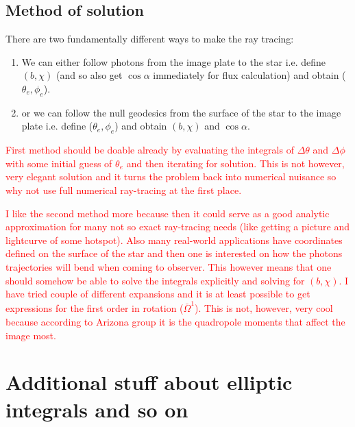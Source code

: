 \documentclass[iop, usenatbib]{emulateapj}
\newcommand{\red}[1]{\textcolor{red}{#1}}
\newcommand{\Ob}{\ensuremath{\bar{\Omega}}}
\begin{document}


\clearpage
\appendix

\subsection{Method of solution}
There are two fundamentally different ways to make the ray tracing:
\begin{enumerate}
\item We can either follow photons from the image plate to the star i.e. define $(b,\chi)$ (and so also get $\cos\alpha$ immediately for flux calculation) and obtain ($\theta_e,\phi_e$).
\item or we can follow the null geodesics from the surface of the star to the image plate i.e. define ($\theta_e,\phi_e$) and obtain $(b, \chi)$ and $\cos\alpha$.
\end{enumerate}

\red{
First method should be doable already by evaluating the integrals of $\Delta\theta$ and $\Delta\phi$ with some initial guess of $\theta_e$ and then iterating for solution.
This is not however, very elegant solution and it turns the problem back into numerical nuisance so why not use full numerical ray-tracing at the first place.
}

\red{
I like the second method more because then it could serve as a good analytic approximation for many not so exact ray-tracing needs (like getting a picture and lightcurve of some hotspot).
Also many real-world applications have coordinates defined on the surface of the star and then one is interested on how the photons trajectories will bend when coming to observer.
This however means that one should somehow be able to solve the integrals explicitly and solving for $(b, \chi)$.
I have tried couple of different expansions and it is at least possible to get expressions for the first order in rotation ($\Ob^1$).
This is not, however, very cool because according to Arizona group it is the quadropole moments that affect the image most.
}


\section{Additional stuff about elliptic integrals and so on}
\end{document}
